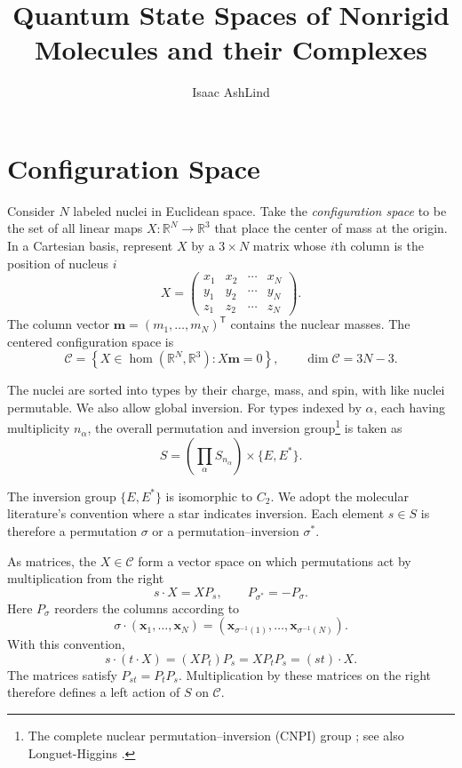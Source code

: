 \documentclass[12pt]{article}
\title{Quantum State Spaces of Nonrigid\\ Molecules and their Complexes}
\author{Isaac AshLind}
\date{}
\newcommand{\R}{\mathbb{R}}
\newcommand{\conf}{\mathcal{C}}
\newcommand{\act}{\mathbin{\cdot}}
\begin{document}
\maketitle


\clearpage

\section{Configuration Space}

Consider $N$ labeled nuclei in Euclidean space. 
Take
the \emph{configuration space} to be the set of all linear
maps $X: \R^N \to\R^3$ that place the center of mass
at the origin.
In a Cartesian basis, represent $X$ by a $3\times N$ matrix whose $i$th column is the position of nucleus $i$
\[
X=
\begin{pmatrix}
    x_1 & x_2 & \cdots & x_N \\
    y_1 & y_2 & \cdots & y_N \\
    z_1 & z_2 & \cdots & z_N
\end{pmatrix}.
\]
The column vector $\mathbf m=(m_1,\ldots,m_N)^{\mathsf T}$
contains the nuclear masses. The centered configuration
space is
\[
\conf
=
\left\{
X\in\hom(\R^N,\R^3):X\mathbf m=0
\right\},
\qquad
\dim\conf=3N-3.
\]

The nuclei are sorted into types by their charge, mass,
and spin, with like nuclei permutable. We also allow global
inversion. For types indexed by $\alpha$, each having
multiplicity $n_\alpha$, the overall permutation and
inversion group\footnote{The complete nuclear
permutation--inversion (CNPI) group
\cite{BunkerEtAl1997}; see also Longuet-Higgins
\cite{LonguetHiggins1963}.} is taken as
\[
S=\left(\prod_\alpha S_{n_\alpha}\right)
\times\{E,E^*\}.
\]

The inversion group $\{E,E^*\}$ is isomorphic to $C_2$.
We adopt the molecular literature's convention where
a star indicates inversion. Each element $s\in S$ is
therefore a permutation $\sigma$ or a
permutation--inversion $\sigma^*$.

As matrices, the $X\in\conf$ form a vector space on which
permutations act by multiplication from the right
\[
s\act X=XP_s,
\qquad
P_{\sigma^*}=-P_\sigma.
\]
Here $P_\sigma$ reorders the columns according to
\[
\sigma\act(\mathbf x_1,\ldots, \mathbf x_N)
=
(\mathbf x_{\sigma^{-1}(1)},\ldots,\mathbf x_{\sigma^{-1}(N)}).
\]
With this convention,
\[
s\act(t\act X)
=(XP_t)P_s
=XP_tP_s
=(st)\act X.
\]
The matrices satisfy $P_{st}=P_tP_s$. Multiplication by
these matrices on the right therefore defines a left
action of $S$ on $\conf$.
\end{document}
